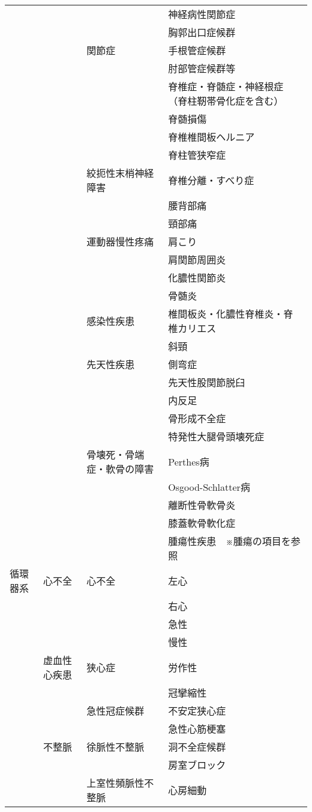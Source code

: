 \begin{xltabular}{\linewidth}{XXXX}
 &  &  & 神経病性関節症 \\
 &  &  & 胸郭出口症候群 \\
 &  & 関節症 & 手根管症候群 \\
 &  &  & 肘部管症候群等 \\
 &  &  & 脊椎症・脊髄症・神経根症（脊柱靭帯骨化症を含む） \\
 &  &  & 脊髄損傷 \\
 &  &  & 脊椎椎間板ヘルニア \\
 &  &  & 脊柱管狭窄症 \\
 &  & 絞扼性末梢神経障害 & 脊椎分離・すべり症 \\
 &  &  & 腰背部痛 \\
 &  &  & 頸部痛 \\
 &  & 運動器慢性疼痛 & 肩こり \\
 &  &  & 肩関節周囲炎 \\
 &  &  & 化膿性関節炎 \\
 &  &  & 骨髄炎 \\
 &  & 感染性疾患 & 椎間板炎・化膿性脊椎炎・脊椎カリエス \\
 &  &  & 斜頸 \\
 &  & 先天性疾患 & 側弯症 \\
 &  &  & 先天性股関節脱臼 \\
 &  &  & 内反足 \\
 &  &  & 骨形成不全症 \\
 &  &  & 特発性大腿骨頭壊死症 \\
 &  & 骨壊死・骨端症・軟骨の障害 & Perthes病 \\
 &  &  & Osgood-Schlatter病 \\
 &  &  & 離断性骨軟骨炎 \\
 &  &  & 膝蓋軟骨軟化症 \\
 &  &  & 腫瘍性疾患　※腫瘍の項目を参照 \\
循環器系 & 心不全 & 心不全 & 左心 \\
 &  &  & 右心 \\
 &  &  & 急性 \\
 &  &  & 慢性 \\
 & 虚血性心疾患 & 狭心症 & 労作性 \\
 &  &  & 冠攣縮性 \\
 &  & 急性冠症候群 & 不安定狭心症 \\
 &  &  & 急性心筋梗塞 \\
 & 不整脈 & 徐脈性不整脈 & 洞不全症候群 \\
 &  &  & 房室ブロック \\
 &  & 上室性頻脈性不整脈 & 心房細動 \\

\end{xltabular}
